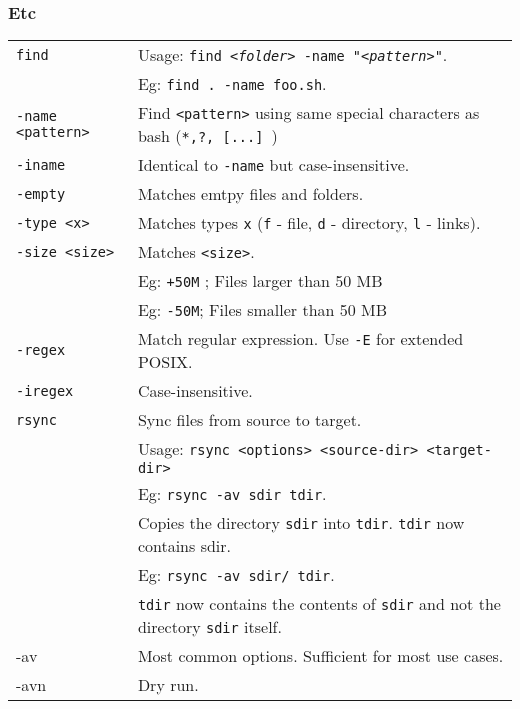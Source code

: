 \subsubsection{Etc}

\begin{tabularx}{\linewidth}{lX}
    \texttt{find}               & Usage: \texttt{find \textit{<folder>} -name "\textit{<pattern>}"}.\\
                                & Eg: \texttt{find . -name foo.sh}.\\
    \texttt{-name <pattern>}    & Find \texttt{<pattern>} using same special characters as bash (\texttt{*,?, [...] })\\
    \texttt{-iname}             & Identical to \texttt{-name} but case-insensitive.\\
    \texttt{-empty}             & Matches emtpy files and folders.\\
    \texttt{-type <x>}          & Matches types \texttt{x} (\texttt{f} - file, \texttt{d} - directory, \texttt{l} - links).\\
    \texttt{-size <size>}       & Matches \texttt{<size>}.\\
                                &  Eg: \texttt{+50M} ; Files larger than 50 MB\\
                                & Eg: \texttt{-50M}; Files smaller than 50 MB\\
    \texttt{-regex}             & Match regular expression. Use \texttt{-E} for extended POSIX.\\
    \texttt{-iregex}            & Case-insensitive.\\
    \hline

    \texttt{rsync}              & Sync files from source to target.\\
                                & Usage: \texttt{rsync <options> <source-dir> <target-dir>}\\
                                & Eg: \texttt{rsync -av sdir tdir}.\\
                                & Copies the directory \texttt{sdir} into \texttt{tdir}. \texttt{tdir} now contains sdir.\\
                                & Eg: \texttt{rsync -av sdir/ tdir}.\\
                                & \texttt{tdir} now contains the contents of \texttt{sdir} and not the directory \texttt{sdir} itself.\\
    -av                         & Most common options. Sufficient for most use cases.\\
    -avn                        & Dry run.\\
    

\end{tabularx}
